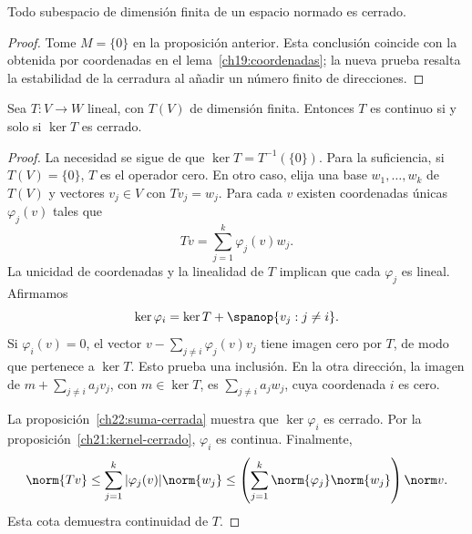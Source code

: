 \begin{corolario}\label{ch22:finito-cerrado}
Todo subespacio de dimensión finita de un espacio normado es cerrado.
\end{corolario}
\begin{proof}
Tome $M=\{0\}$ en la proposición anterior. Esta conclusión coincide con la obtenida por coordenadas en el lema~\ref{ch19:coordenadas}; la nueva prueba resalta la estabilidad de la cerradura al añadir un número finito de direcciones.
\end{proof}

\begin{teorema}\label{ch22:rango-finito-kernel}
Sea $T:V\to W$ lineal, con $T(V)$ de dimensión finita. Entonces $T$ es continuo si y solo si $\ker T$ es cerrado.
\end{teorema}
\begin{proof}
La necesidad se sigue de que $\ker T=T^{-1}(\{0\})$. Para la suficiencia, si $T(V)=\{0\}$, $T$ es el operador cero. En otro caso, elija una base $w_1,\ldots,w_k$ de $T(V)$ y vectores $v_j\in V$ con $Tv_j=w_j$. Para cada $v$ existen coordenadas únicas $\varphi_j(v)$ tales que
\[
 Tv=\sum_{j=1}^k\varphi_j(v)w_j.
\]
La unicidad de coordenadas y la linealidad de $T$ implican que cada $\varphi_j$ es lineal. Afirmamos
\[
 \ker\varphi_i=\ker T+\spanop\{v_j:j\ne i\}.
\]
Si $\varphi_i(v)=0$, el vector $v-\sum_{j\ne i}\varphi_j(v)v_j$ tiene imagen cero por $T$, de modo que pertenece a $\ker T$. Esto prueba una inclusión. En la otra dirección, la imagen de $m+\sum_{j\ne i}a_jv_j$, con $m\in\ker T$, es $\sum_{j\ne i}a_jw_j$, cuya coordenada $i$ es cero.

La proposición~\ref{ch22:suma-cerrada} muestra que $\ker\varphi_i$ es cerrado. Por la proposición~\ref{ch21:kernel-cerrado}, $\varphi_i$ es continua. Finalmente,
\[
 \norm{Tv}\leq\sum_{j=1}^k|\varphi_j(v)|\norm{w_j}
 \leq\left(\sum_{j=1}^k\norm{\varphi_j}\norm{w_j}\right)\norm v.
\]
Esta cota demuestra continuidad de $T$.
\end{proof}

